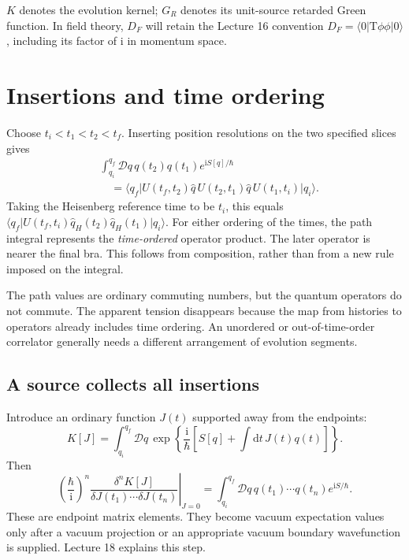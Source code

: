 \documentclass[11pt]{article}
\newcommand{\dd}{\mathrm d}
\newcommand{\ii}{\mathrm i}
\newcommand{\D}{\mathcal D}
\newcommand{\Tord}{\mathrm T}
\newcommand{\ket}[1]{\lvert#1\rangle}
\newcommand{\bra}[1]{\langle#1\rvert}
\newcommand{\module}[1]{\clearpage\section{#1}}
\begin{document}
\begin{remarkbox}
\(K\) denotes the evolution kernel; \(G_R\) denotes its unit-source
retarded Green function. In field theory, \(D_F\) will retain the
Lecture 16 convention \(D_F=\langle0|\Tord\phi\phi|0\rangle\),
including its factor of \(\ii\) in momentum space.
\end{remarkbox}

\module{Insertions and time ordering}
Choose \(t_i<t_1<t_2<t_f\). Inserting position resolutions on the
two specified slices gives
\begin{align}
 &\int_{q_i}^{q_f}\D q\,q(t_2)q(t_1)e^{\ii S[q]/\hbar}\nonumber\\
 &\quad=\bra{q_f}U(t_f,t_2)\hat q\,U(t_2,t_1)\hat q\,
 U(t_1,t_i)\ket{q_i}.                              \label{eq:insert}
\end{align}
Taking the Heisenberg reference time to be \(t_i\), this equals
\(\bra{q_f}U(t_f,t_i)\hat q_H(t_2)\hat q_H(t_1)\ket{q_i}\).
For either ordering of the times, the path integral represents the
\emph{time-ordered} operator product. The later operator is nearer
the final bra. This follows from composition, rather than from a
new rule imposed on the integral.

The path values are ordinary commuting numbers, but the quantum
operators do not commute. The apparent tension disappears because
the map from histories to operators already includes time ordering.
An unordered or out-of-time-order correlator generally needs a
different arrangement of evolution segments.

\subsection{A source collects all insertions}
Introduce an ordinary function \(J(t)\) supported away from the endpoints:
\begin{equation}
 K[J]=\int_{q_i}^{q_f}\D q\,
 \exp\!\left\{\frac{\ii}{\hbar}\left[S[q]+\int\dd t\,J(t)q(t)\right]\right\}.
\end{equation}
Then
\begin{equation}
 \left.\left(\frac{\hbar}{\ii}\right)^n
 \frac{\delta^n K[J]}{\delta J(t_1)\cdots\delta J(t_n)}\right|_{J=0}
 =\int_{q_i}^{q_f}\D q\,q(t_1)\cdots q(t_n)e^{\ii S/\hbar}.
\end{equation}
These are endpoint matrix elements. They become vacuum expectation
values only after a vacuum projection or an appropriate vacuum boundary
wavefunction is supplied. Lecture 18 explains this step.
\end{document}
